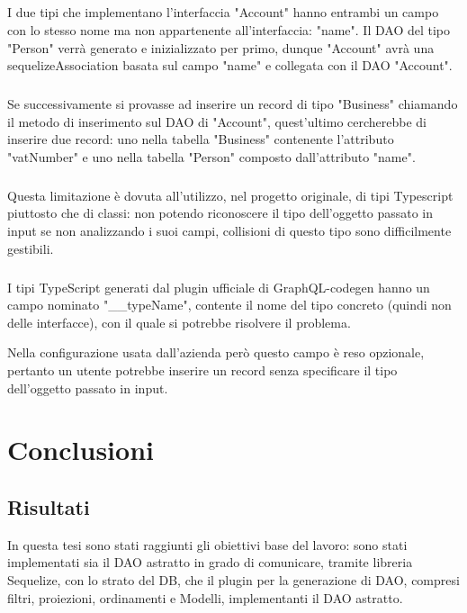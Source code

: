 \documentclass[a4paper, 12pt]{report}
\begin{document}
      \paragraph*{}
      I due tipi che implementano l'interfaccia "Account" hanno entrambi un campo con lo stesso nome ma non appartenente all'interfaccia: "name".
      Il DAO del tipo "Person" verrà generato e inizializzato per primo, dunque "Account" avrà una sequelizeAssociation basata sul campo "name" e collegata con il DAO "Account".
      \paragraph*{}
      Se successivamente si provasse ad inserire un record di tipo "Business" chiamando il metodo di inserimento sul DAO di "Account", quest'ultimo cercherebbe di inserire due record: uno nella tabella "Business" contenente l'attributo "vatNumber" e uno nella tabella "Person" composto dall'attributo "name".
      \paragraph*{}
      Questa limitazione è dovuta all'utilizzo, nel progetto originale, di tipi Typescript piuttosto che di classi: non potendo riconoscere il tipo dell'oggetto passato in input se non analizzando i suoi campi, collisioni di questo tipo sono difficilmente gestibili.
      \paragraph*{}
      I tipi TypeScript generati dal plugin ufficiale di GraphQL-codegen hanno un campo nominato "__typeName", contente il nome del tipo concreto (quindi non delle interfacce), con il quale si potrebbe risolvere il problema.

      Nella configurazione usata dall'azienda però questo campo è reso opzionale, pertanto un utente potrebbe inserire un record senza specificare il tipo dell'oggetto passato in input.

    \newpage
    \chapter{Conclusioni}
      \section*{Risultati}
      In questa tesi sono stati raggiunti gli obiettivi base del lavoro: sono stati implementati sia il DAO astratto in grado di comunicare, tramite libreria Sequelize, con lo strato del DB, che il plugin per la generazione di DAO, compresi filtri, proiezioni, ordinamenti e Modelli, implementanti il DAO astratto.
\end{document}
